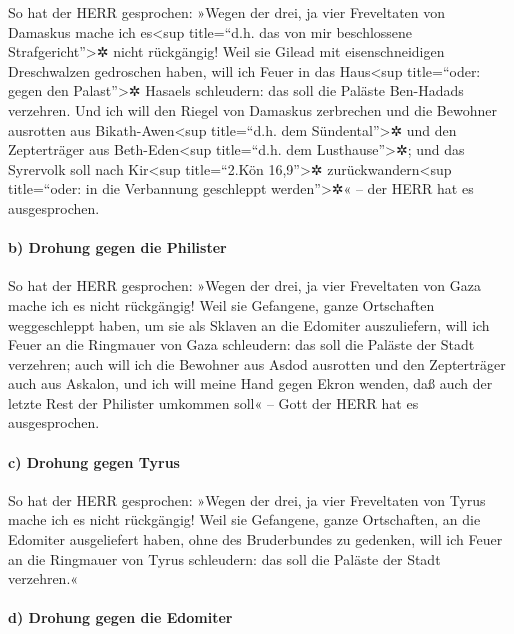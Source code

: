 So hat der HERR gesprochen: »Wegen der drei, ja vier
Freveltaten von Damaskus mache ich es\textless sup title=``d.h. das von
mir beschlossene Strafgericht''\textgreater✲ nicht rückgängig! Weil sie
Gilead mit eisenschneidigen Dreschwalzen gedroschen haben,
will ich Feuer in das Haus\textless sup title=``oder:
gegen den Palast''\textgreater✲ Hasaels schleudern: das soll die Paläste
Ben-Hadads verzehren. Und ich will den Riegel von Damaskus
zerbrechen und die Bewohner ausrotten aus Bikath-Awen\textless sup
title=``d.h. dem Sündental''\textgreater✲ und den Zepterträger aus
Beth-Eden\textless sup title=``d.h. dem Lusthause''\textgreater✲; und
das Syrervolk soll nach Kir\textless sup title=``2.Kön
16,9''\textgreater✲ zurückwandern\textless sup title=``oder: in die
Verbannung geschleppt werden''\textgreater✲« -- der HERR hat es
ausgesprochen.

\hypertarget{b-drohung-gegen-die-philister}{%
\paragraph{b) Drohung gegen die
Philister}\label{b-drohung-gegen-die-philister}}

So hat der HERR gesprochen: »Wegen der drei, ja vier
Freveltaten von Gaza mache ich es nicht rückgängig! Weil sie Gefangene,
ganze Ortschaften weggeschleppt haben, um sie als Sklaven an die
Edomiter auszuliefern, will ich Feuer an die Ringmauer von
Gaza schleudern: das soll die Paläste der Stadt verzehren;
auch will ich die Bewohner aus Asdod ausrotten und den
Zepterträger auch aus Askalon, und ich will meine Hand gegen Ekron
wenden, daß auch der letzte Rest der Philister umkommen soll« -- Gott
der HERR hat es ausgesprochen.

\hypertarget{c-drohung-gegen-tyrus}{%
\paragraph{c) Drohung gegen Tyrus}\label{c-drohung-gegen-tyrus}}

So hat der HERR gesprochen: »Wegen der drei, ja vier
Freveltaten von Tyrus mache ich es nicht rückgängig! Weil sie Gefangene,
ganze Ortschaften, an die Edomiter ausgeliefert haben, ohne des
Bruderbundes zu gedenken, will ich Feuer an die Ringmauer
von Tyrus schleudern: das soll die Paläste der Stadt verzehren.«

\hypertarget{d-drohung-gegen-die-edomiter}{%
\paragraph{d) Drohung gegen die
Edomiter}\label{d-drohung-gegen-die-edomiter}}

